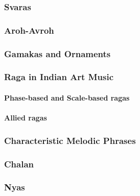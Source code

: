 \subsubsection{Svaras}

\subsubsection{Aroh-Avroh}

\subsubsection{Gamakas and Ornaments}

\subsubsection{Raga in Indian Art Music}

\paragraph{Phase-based and Scale-based ragas}
\paragraph{Allied ragas}

\subsubsection{Characteristic Melodic Phrases}

\subsubsection{Chalan}

\subsubsection{Nyas}
\label{sec:backgroung_nyas_description}

